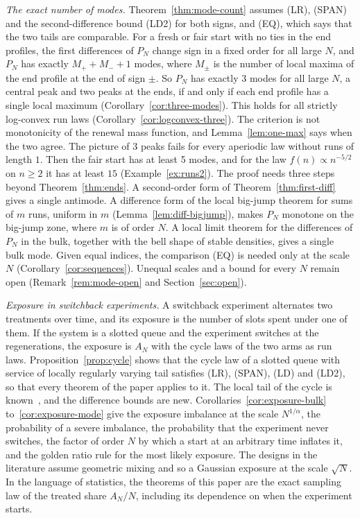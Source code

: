 \emph{The exact number of modes.} Theorem~\ref{thm:mode-count} assumes (LR), (SPAN) and the
second-difference bound (LD2) for both signs, and (EQ), which says that the two tails are
comparable. For a fresh or fair start with no ties in the end profiles, the first differences
of $P_N$ change sign in a fixed order for all large $N$, and $P_N$ has exactly
$M_\plus+M_\minus+1$ modes, where $M_\pm$ is the number of local maxima of the end profile at
the end of sign $\pm$. So $P_N$ has exactly 3 modes for all large $N$, a central peak and two
peaks at the ends, if and only if each end profile has a single local maximum
(Corollary~\ref{cor:three-modes}). This holds for all strictly log-convex run laws
(Corollary~\ref{cor:logconvex-three}). The criterion is not monotonicity of the renewal mass
function, and Lemma~\ref{lem:one-max} says when the two agree. The picture of 3 peaks fails
for every aperiodic law without runs of length $1$. Then the fair start has at least 5
modes, and for the law $f(n)\propto n^{-5/2}$ on $n\ge2$ it has at least $15$
(Example~\ref{ex:runs2}). The proof needs three steps beyond Theorem~\ref{thm:ends}. A
second-order form of Theorem~\ref{thm:first-diff} gives a single antimode. A difference form
of the local big-jump theorem for sums of $m$ runs, uniform in $m$
(Lemma~\ref{lem:diff-bigjump}), makes $P_N$ monotone on the big-jump zone, where $m$ is of
order $N$. A local limit theorem for the differences of $P_N$ in the bulk, together with the
bell shape of stable densities, gives a single bulk mode. Given equal indices, the comparison
(EQ) is needed only at the scale $N$ (Corollary~\ref{cor:sequences}). Unequal scales and a
bound for every $N$ remain open (Remark~\ref{rem:mode-open} and Section~\ref{sec:open}).

\emph{Exposure in switchback experiments.} A switchback experiment alternates two treatments
over time, and its exposure is the number of slots spent under one of them. If the system is
a slotted queue and the experiment switches at the regenerations, the exposure is $A_N$ with
the cycle laws of the two arms as run laws. Proposition~\ref{prop:cycle} shows that the cycle
law of a slotted queue with service of locally regularly varying tail satisfies (LR), (SPAN),
(LD) and (LD2), so that every theorem of the paper applies to it. The local tail of the
cycle is known~\cite{kortchemski2015,janson2012,denisovshneer2010}, and the difference bounds
are new. Corollaries~\ref{cor:exposure-bulk} to~\ref{cor:exposure-mode} give the exposure
imbalance at the scale $N^{1/\alpha}$, the probability of a severe imbalance, the probability
that the experiment never switches, the factor of order $N$ by which a start at an arbitrary
time inflates it, and the golden ratio rule for the most likely exposure. The designs in the
literature assume geometric mixing and so a Gaussian exposure at the scale $\sqrt N$. In the
language of statistics, the theorems of this paper are the exact sampling law of the
treated share $A_N/N$, including its dependence on when the experiment starts.

